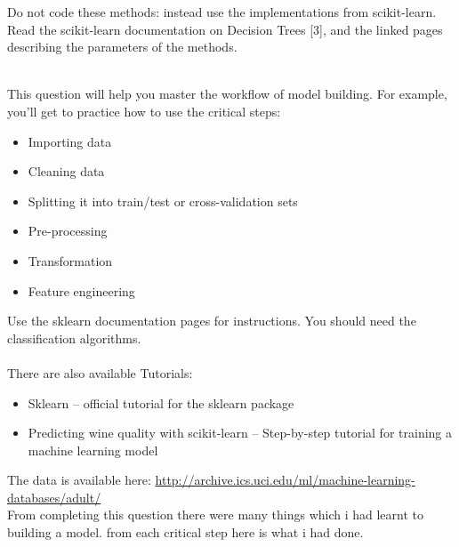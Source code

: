 \documentclass{article}
\newcommand*\fixindent{ \hspace{1pt}\\}
\begin{document}
\begin{flushleft}
Do not code these methods: instead use the implementations from scikit-learn. Read the scikit-learn documentation on Decision Trees [3], and the linked pages describing the parameters of the methods.\\\\
\end{flushleft}
This question will help you master the workflow of model building. For example, you’ll get to practice how to use the critical steps:

\begin{itemize}
    \item {Importing data}
    \item {Cleaning data}
    \item {Splitting it into train/test or cross-validation sets}
    \item {Pre-processing}
    \item {Transformation}
    \item {Feature engineering}
\end{itemize}
Use the sklearn documentation pages for instructions. You should need the classification algorithms.\\\\
There are also available Tutorials:
\begin{itemize}
    \item Sklearn – official tutorial for the sklearn package 
    \item Predicting wine quality with scikit-learn – Step-by-step tutorial for training a machine learning model
\end{itemize}
The data is available here: \href{http://archive.ics.uci.edu/ml/machine-learning-databases/adult/}{http://archive.ics.uci.edu/ml/machine-learning-databases/adult/}
\newpage
\fixindent{}From completing this question there were many things which i had learnt to building a model. from each critical step here is what i had done.\\
\end{document}
